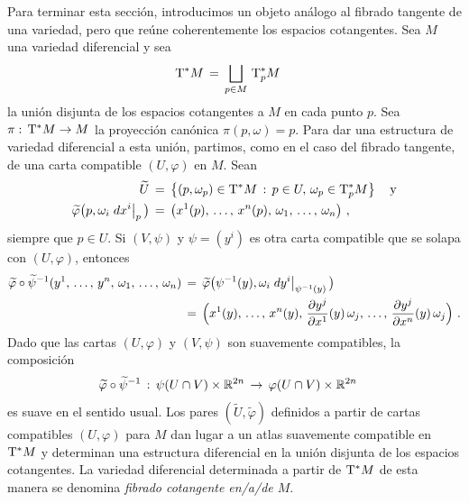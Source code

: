 Para terminar esta secci\'{o}n, introducimos un objeto an\'{a}logo
al fibrado tangente de una variedad, pero que re\'{u}ne coherentemente los
espacios cotangentes. Sea $M$ una variedad diferencial y sea
\begin{align*}
	\tangente*{M} & \,=\,\bigsqcup_{p\in M}\,\tangente*[p]{M}
\end{align*}
%
la uni\'{o}n disjunta de los espacios cotangentes a $M$ en cada punto $p$.
Sea $\pi:\,\tangente*{M}\rightarrow M$ la proyecci\'{o}n can\'{o}nica
$\pi(p,\omega)=p$. Para dar una estructura de variedad diferencial a
esta uni\'{o}n, partimos, como en el caso del fibrado tangente, de una
carta compatible $(U,\varphi)$ en $M$. Sean
\begin{align*}
	\widetilde{U} & \,=\, \left\lbrace (p,\omega_{p})\in\tangente*{M}
		\,:\,p\in U,\,\omega_{p}\in\tangente*[p]{M}
		\right\rbrace
	\quad\text{y} \\
	\widetilde{\varphi}\big(p,\omega_{i}\de[p]{x^{i}}\big) & \,=\,\big(
		x^{1}(p),\,\dots,\,x^{n}(p),\,\omega_{1},\,\dots,\,\omega_{n}
		\big)
	\text{ ,}
\end{align*}
%
siempre que $p\in U$. Si $(V,\psi)$ y $\psi=(y^{i})$ es otra carta
compatible que se solapa con $(U,\varphi)$, entonces
\begin{align*}
	\widetilde{\varphi}\circ\widetilde{\psi}^{-1}(
		\lista*{y}{n},\,\lista{\omega}{n}) & \,=\,
		\widetilde{\varphi}\big(\psi^{-1}(y),
		\omega_{i}\de[\psi^{-1}(y)]{y^{i}}\big) \\
	& \,=\, \Big(x^{1}(y),\,\dots,\,x^{n}(y),\,
		\derivada{y^{j}}{x^{1}}(y)\,\omega_{j},\,\dots,\,
		\derivada{y^{j}}{x^{n}}(y)\,\omega_{j}\Big)
	\text{ .}
\end{align*}
%
Dado que las cartas $(U,\varphi)$ y $(V,\psi)$ son suavemente compatibles,
la composici\'{o}n 
\begin{align*}
	\widetilde{\varphi}\circ\widetilde{\psi}^{-1} & \,:\,
		\psi(U\cap V)\times\mathbb{R}^{2n}\,\rightarrow\,
		\varphi(U\cap V)\times\mathbb{R}^{2n}
\end{align*}
%
es suave en el sentido usual. Los pares $(\widetilde{U},\widetilde{\varphi})$
definidos a partir de cartas compatibles $(U,\varphi)$ para $M$ dan lugar a
un atlas suavemente compatible en $\tangente*{M}$ y determinan una
estructura diferencial en la uni\'{o}n disjunta de los espacios cotangentes.
La variedad diferencial determinada a partir de $\tangente*{M}$ de esta
manera se denomina \emph{fibrado cotangente en/a/de $M$}.


